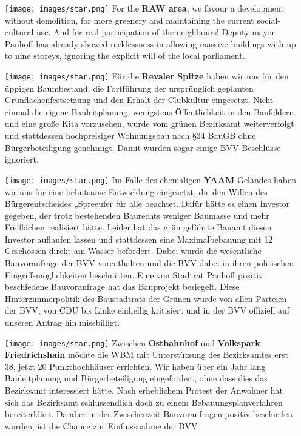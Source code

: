 \documentclass[a4paper,10pt]{article}
\begin{document}
\begin{itemize}
\item[\texttt{[image: images/star.png]}]
  For the \textbf{RAW area}, we favour a development without demolition, for more greenery and maintaining the current social-cultural use. And for real participation of the neighbours!
  Deputy mayor Panhoff has already showed recklessness in allowing massive buildings with up to nine storeys, ignoring the explicit will of the local parliament.
\item[\texttt{[image: images/star.png]}]
  Für die \textbf{Revaler Spitze} haben wir uns für den üppigen
  Baumbestand, die Fortführung der ursprünglich geplanten
  Grünflächenfestsetzung und den Erhalt der Clubkultur eingesetzt. Nicht
  einmal die eigene Bauleitplanung, wenigstens Öffentlichkeit in den
  Baufeldern und eine große Kita vorzusehen, wurde vom grünen Bezirksamt
  weiterverfolgt und stattdessen hochpreisiger Wohnungsbau nach §34
  BauGB ohne Bürgerbeteiligung genehmigt. Damit wurden sogar einige
  BVV-Beschlüsse ignoriert.
  \enlargethispage{-4em}
\item[\texttt{[image: images/star.png]}]
  Im Falle des ehemaligen \textbf{YAAM}-Geländes haben wir uns für eine
  behutsame Entwicklung eingesetzt, die den Willen des Bürgerentscheides
  „Spreeufer für alle{\grqq} beachtet. Dafür hätte es einen Investor gegeben,
  der trotz bestehenden Baurechts weniger Baumasse und mehr Freiflächen
  realisiert hätte. Leider hat das grün geführte Bauamt diesen Investor
  auflaufen lassen und stattdessen eine Maximalbebauung mit 12
  Geschossen direkt am Wasser befördert. Dabei wurde die wesentliche
  Bauvoranfrage der BVV vorenthalten und die BVV dabei in ihren
  politischen Eingriffsmöglichkeiten beschnitten. Eine von Stadtrat
  Panhoff positiv beschiedene Bauvoranfrage hat das Bauprojekt
  besiegelt. Diese Hinterzimmerpolitik des Baustadtrats der Grünen wurde
  von allen Parteien der BVV, von CDU bis Linke einhellig kritisiert und
  in der BVV offiziell auf unseren Antrag hin missbilligt.
\item[\texttt{[image: images/star.png]}]
  Zwischen \textbf{Ostbahnhof} 
  und \textbf{Volkspark Friedrichshain} möchte die
  WBM mit Unterstützung des Bezirksamtes erst 38, jetzt 20
  Punkthochhäuser errichten. Wir haben über ein Jahr lang Bauleitplanung
  und Bürgerbeteiligung eingefordert, ohne dass dies das Bezirksamt
  interessiert hätte. Nach erheblichem Protest der Anwohner hat sich das
  Bezirksamt schlussendlich doch zu einem Bebauungsplanverfahren
  bereiterklärt. Da aber in der Zwischenzeit Bauvoranfragen positiv
  beschieden wurden, ist die Chance zur Einflussnahme der BVV

\end{itemize}
\end{document}
